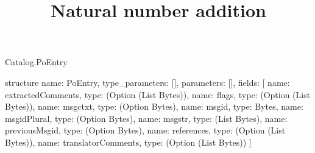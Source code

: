 \begin{lexlean}{Catalog.PoEntry}
\title{Natural number addition}
\begin{semanticmodule}
structure{
  name: PoEntry,
  type_parameters: [],
  parameters: [],
  fields: [
    {name: extractedComments, type: (Option (List Bytes))},
    {name: flags, type: (Option (List Bytes))},
    {name: msgctxt, type: (Option Bytes)},
    {name: msgid, type: Bytes},
    {name: msgidPlural, type: (Option Bytes)},
    {name: msgstr, type: (List Bytes)},
    {name: previousMsgid, type: (Option Bytes)},
    {name: references, type: (Option (List Bytes))},
    {name: translatorComments, type: (Option (List Bytes))}
  ]
}
\end{semanticmodule}
\end{lexlean}
